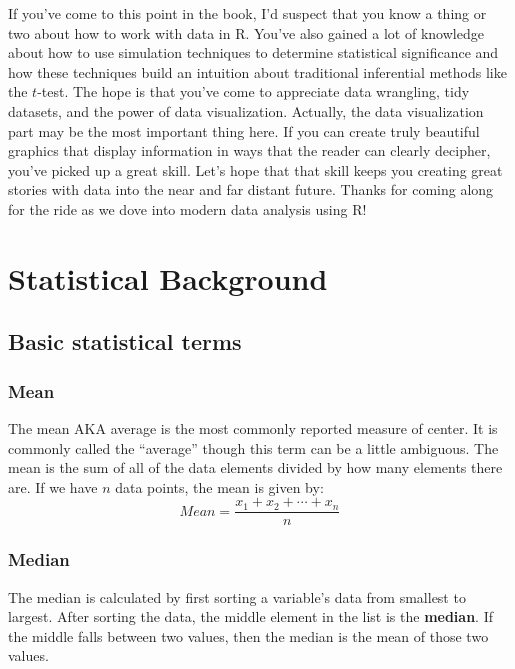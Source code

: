 \documentclass[12pt, krantz2,]{krantz}
\begin{document}
If you've come to this point in the book, I'd suspect that you know a thing or two about how to work with data in R. You've also gained a lot of knowledge about how to use simulation techniques to determine statistical significance and how these techniques build an intuition about traditional inferential methods like the \(t\)-test. The hope is that you've come to appreciate data wrangling, tidy datasets, and the power of data visualization. Actually, the data visualization part may be the most important thing here. If you can create truly beautiful graphics that display information in ways that the reader can clearly decipher, you've picked up a great skill. Let's hope that that skill keeps you creating great stories with data into the near and far distant future. Thanks for coming along for the ride as we dove into modern data analysis using R!

\cleardoublepage

\hypertarget{appendix-appendix}{%
\appendix {}}


\hypertarget{appendixA}{%
\chapter{Statistical Background}\label{appendixA}}

\hypertarget{basic-statistical-terms}{%
\section{Basic statistical terms}\label{basic-statistical-terms}}

\hypertarget{mean}{%
\subsection{Mean}\label{mean}}

The mean AKA average is the most commonly reported measure of center. It is commonly called the ``average'' though this term can be a little ambiguous. The mean is the sum of all of the data elements divided by how many elements there are. If we have \(n\) data points, the mean is given by: \[Mean = \frac{x_1 + x_2 + \cdots + x_n}{n}\]

\hypertarget{median}{%
\subsection{Median}\label{median}}

The median is calculated by first sorting a variable's data from smallest to largest. After sorting the data, the middle element in the list is the \textbf{median}. If the middle falls between two values, then the median is the mean of those two values.
\end{document}
